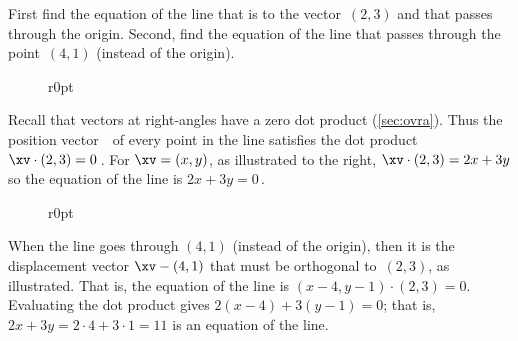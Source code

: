 \begin{example} 
First find the equation of the line that is  to the vector~\((2,3)\) and that passes through the origin.
Second, find the equation of the line that passes through the point~\((4,1)\) (instead of the origin).

\begin{solution} 
\begin{wrapfigure}[5]r{0pt}
\end{wrapfigure}
Recall that vectors at right-angles have a zero dot product (\cref{sec:ovra}).
Thus the position vector~\xv\ of every point in the line satisfies the dot product \(\xv\cdot(2,3)=0\)\,.
For \(\xv=(x,y)\), as illustrated to the right, \(\xv\cdot(2,3)=2x+3y\) so the equation of the line is \(2x+3y=0\)\,.

\vspace{1\baselineskip}
\begin{wrapfigure}r{0pt}
\end{wrapfigure}
When the line goes through \((4,1)\) (instead of the origin), then it is the displacement vector \(\xv-(4,1)\) that must be orthogonal to~\((2,3)\), as illustrated.
That is, the equation of the line is \((x-4,y-1)\cdot(2,3)=0\).
Evaluating the dot product gives \(2(x-4)+3(y-1)=0\); that is, \(2x+3y=2\cdot4+3\cdot1=11\) is an equation of the line.
\aqed\par
\end{solution}
\end{example}





